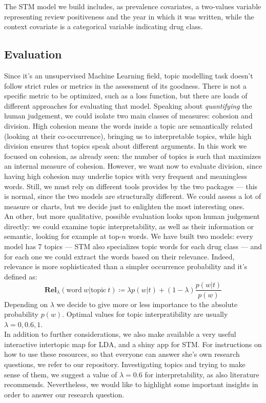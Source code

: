 \documentclass[10pt, a4paper, twocolumn]{article}
\begin{document}
            The STM model we build includes, as prevalence covariates, a two-values variable representing review positiveness and the year in which it was written, while the context covariate is a categorical variable indicating drug class. 
    
        \subsection{Evaluation}
            \label{subsec:top_mod_evaluation}
            Since it's an unsupervised Machine Learning field, topic modelling task doesn't follow strict rules or metrics in the assessment of its goodness. There is not a specific metric to be optimized, such as a loss function, but there are loads of different approaches for evaluating that model. Speaking about \emph{quantifying} the human judgement, we could isolate two main classes of measures: cohesion and division. High cohesion means the words inside a topic are semantically related (looking at their co-occurrence), bringing us to interpretable topics, while high division ensures that topics speak about different arguments. In this work we focused on cohesion, as already seen: the number of topics is such that maximizes an internal measure of cohesion. However, we want now to evaluate division, since having high cohesion may underlie topics with very frequent and meaningless words. Still, we must rely on different tools provides by the two packages  ---  this is normal, since the two models are structurally different. We could assess a lot of measure or charts, but we decide just to enlighten the most interesting ones.\\
            An other, but more qualitative, possible evaluation looks upon human judgement directly: we could examine topic interpretability, as well as their information or semantic, looking for example at top-$n$ words. We have built two models: every model has 7 topics --- STM also specializes topic words for each drug class --- and for each one we could extract the words based on their relevance. Indeed, relevance is more sophisticated than a simpler occurrence probability and it's defined as: 
            $$\mathbf{Rel}_{\lambda}(\text{word}~w|\text{topic}~t)\coloneqq \lambda p(w|t)+(1-\lambda) \frac{p(w|t)}{p(w)}$$
            Depending on $\lambda$ we decide to give more or less importance to the absolute probability $p(w)$. Optimal values for topic interpratibility are usually $\lambda = 0, 0.6, 1$.\\
            In addition to further considerations, we also make available a very useful interactive intertopic map for LDA, and a shiny app for STM. For instructions on how to use these resources, so that everyone can answer she's own research questions, we refer to our \cite{GitHub_NR} repository. Investigating topics and trying to make sense of them, we suggest a value of $\lambda = 0.6$ for interpretability, as also literature recommends. Nevertheless, we would like to highlight some important insights in order to answer our research question.\\
\end{document}
